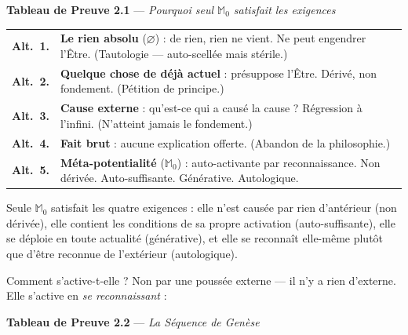 \documentclass[10pt, openany, oneside]{book}
\begin{document}
\vspace{0.5em}

\textbf{Tableau de Preuve 2.1} --- \textit{Pourquoi seul $\mathbb{M}_0$ satisfait les exigences}

\vspace{0.5em}

\noindent\begin{tabular}{r p{}}
\textbf{Alt.\ 1.} & \textbf{Le rien absolu} ($\varnothing$) : de rien, rien ne vient. Ne peut engendrer l'Être. (Tautologie --- auto-scellée mais stérile.) \\[0.3em]
\textbf{Alt.\ 2.} & \textbf{Quelque chose de déjà actuel} : présuppose l'Être. Dérivé, non fondement. (Pétition de principe.) \\[0.3em]
\textbf{Alt.\ 3.} & \textbf{Cause externe} : qu'est-ce qui a causé la cause ? Régression à l'infini. (N'atteint jamais le fondement.) \\[0.3em]
\textbf{Alt.\ 4.} & \textbf{Fait brut} : aucune explication offerte. (Abandon de la philosophie.) \\[0.3em]
\textbf{Alt.\ 5.} & \textbf{Méta-potentialité} ($\mathbb{M}_0$) : auto-activante par reconnaissance. Non dérivée. Auto-suffisante. Générative. Autologique. \\[0.3em]
\end{tabular}

\vspace{0.8em}

\noindent Seule $\mathbb{M}_0$ satisfait les quatre exigences : elle n'est causée par rien d'antérieur (non dérivée), elle contient les conditions de sa propre activation (auto-suffisante), elle se déploie en toute actualité (générative), et elle se reconnaît elle-même plutôt que d'être reconnue de l'extérieur (autologique).

Comment s'active-t-elle ? Non par une poussée externe --- il n'y a rien d'externe. Elle s'active en \textit{se reconnaissant} :

\vspace{0.5em}

\textbf{Tableau de Preuve 2.2} --- \textit{La Séquence de Genèse}

\vspace{0.5em}
\end{document}
